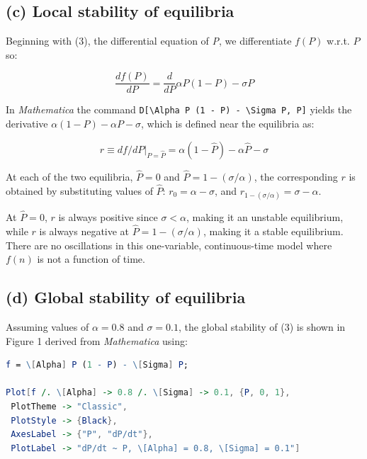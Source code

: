 \hypertarget{c-local-stability-of-equilibria}{%
\subsection{(c) Local stability of
equilibria}\label{c-local-stability-of-equilibria}}

Beginning with (3), the differential equation of \emph{P}, we
differentiate \(f(P)\) w.r.t. \(P\) so:

\begin{equation} \frac{df(P)}{dP} = \frac{d}{dP} \alpha P(1-P) - \sigma P \end{equation}

In \emph{Mathematica} the command
\texttt{D{[}\textbackslash{}Alpha\ P\ (1\ -\ P)\ -\ \textbackslash{}Sigma\ P,\ P{]}}
yields the derivative \(\alpha(1 - P) - \alpha P - \sigma\), which is
defined near the equilibria as:

\begin{equation} r \equiv df/dP|_{P = \hat{P}} = \alpha(1 - \hat{P}) - \alpha \hat{P} - \sigma \end{equation}

At each of the two equilibria, \(\hat{P} = 0\) and
\(\hat{P} = 1 - (\sigma/\alpha)\), the corresponding \(r\) is obtained
by substituting values of \(\hat{P}\): \(r_{0} = \alpha - \sigma\), and
\(r_{1 - (\sigma/\alpha)} = \sigma - \alpha\).

At \(\hat{P} = 0\), \(r\) is always positive since \(\sigma < \alpha\),
making it an unstable equilibrium, while \(r\) is always negative at
\(\hat{P} = 1 - (\sigma/\alpha)\), making it a stable equilibrium. There
are no oscillations in this one-variable, continuous-time model where
\(f(n)\) is not a function of time.

\hypertarget{d-global-stability-of-equilibria}{%
\subsection{(d) Global stability of
equilibria}\label{d-global-stability-of-equilibria}}

Assuming values of \(\alpha = 0.8\) and \(\sigma = 0.1\), the global
stability of (3) is shown in Figure 1 derived from \emph{Mathematica}
using:

\begin{lstlisting}[language=Mathematica]
f = \[Alpha] P (1 - P) - \[Sigma] P;

Plot[f /. \[Alpha] -> 0.8 /. \[Sigma] -> 0.1, {P, 0, 1},
 PlotTheme -> "Classic",
 PlotStyle -> {Black},
 AxesLabel -> {"P", "dP/dt"},
 PlotLabel -> "dP/dt ~ P, \[Alpha] = 0.8, \[Sigma] = 0.1"]

\end{lstlisting}

